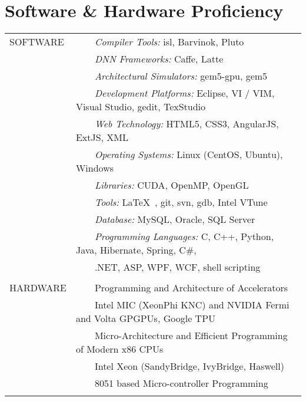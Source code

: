 \documentclass[a4paper,10pt]{article} %
\newcommand{\tabitem}{~~\llap{\textbullet}~~}
\begin{document}
\section{Software \& Hardware Proficiency}
\begin{tabular}{p{3cm}l}
SOFTWARE & \tabitem \textit{Compiler Tools:} isl, Barvinok, Pluto\\
& \tabitem \textit{DNN Frameworks:} Caffe, Latte\\
& \tabitem \textit{Architectural Simulators:} gem5-gpu, gem5\\
& \tabitem \textit{Development Platforms:} Eclipse, VI / VIM, Visual Studio, gedit, TexStudio\\
& \tabitem \textit{Web Technology:} HTML5, CSS3, AngularJS, ExtJS, XML\\
& \tabitem \textit{Operating Systems:} Linux (CentOS, Ubuntu), Windows \\
& \tabitem \textit{Libraries:} CUDA, OpenMP, OpenGL  \\
& \tabitem \textit{Tools:} \LaTeX\ , git, svn, gdb, Intel VTune\\
& \tabitem \textit{Database:} MySQL, Oracle, SQL Server\\
& \tabitem \textit{Programming Languages:} C, C++, Python, Java, Hibernate, Spring, C\#, \\
& ~~~~.NET, ASP, WPF, WCF, shell scripting\\

&\\

HARDWARE  & \tabitem Programming and Architecture of Accelerators \\
& ~~~~Intel MIC (XeonPhi KNC) and NVIDIA Fermi and Volta GPGPUs, Google TPU \\
& \tabitem Micro-Architecture and Efficient Programming of Modern x86 CPUs\\
& ~~~~Intel Xeon (SandyBridge, IvyBridge, Haswell) \\ 
& \tabitem 8051 based Micro-controller Programming \\
&\\
\end{tabular}

\end{document}

